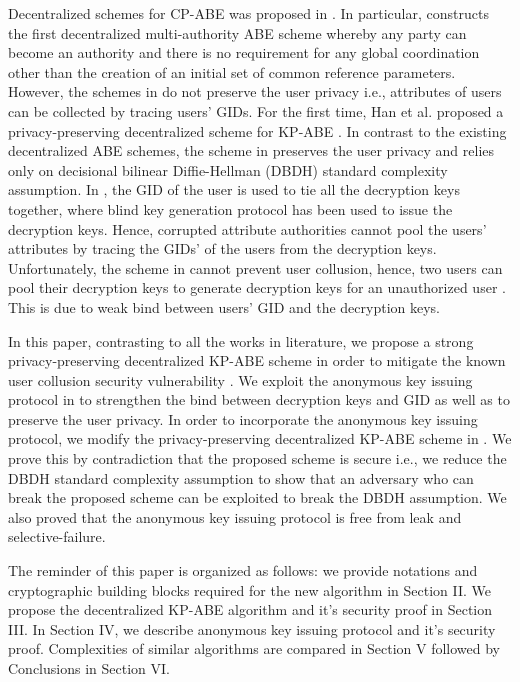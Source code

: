 \documentclass[10pt,journal]{IEEEtran}
\begin{document}
Decentralized schemes for CP-ABE was proposed in \cite{Dabe,Muller1, Muller2, ZLiu, OT13}.  In particular, \cite{Dabe} constructs the first decentralized multi-authority ABE scheme whereby any party can become an authority and there is no requirement for any global coordination
other than the creation of an initial set of common reference parameters. However, the schemes in \cite{Dabe,BWaters,Muller1, Muller2, ZLiu, OT13} do not preserve the user privacy i.e., attributes of users can be collected by tracing users' GIDs. For the first time, Han et al. proposed a privacy-preserving decentralized scheme for KP-ABE \cite{main1}. In contrast to the existing decentralized ABE schemes,  the scheme in \cite{main1} preserves the user privacy and relies only on decisional bilinear Diffie-Hellman (DBDH) standard complexity assumption.
In \cite{main1}, the GID of the user is used to tie all the decryption keys together, where blind key generation protocol has been used to issue the decryption keys. Hence, corrupted attribute authorities cannot pool the users' attributes by tracing the GIDs' of the users from the decryption keys. Unfortunately, the scheme in \cite{main1} cannot prevent  user collusion, hence, two users can pool their decryption keys  to generate decryption keys for an unauthorized user \cite{main2}. This is due to weak bind between users' GID and the decryption keys.

In this paper, contrasting to all the works in literature, we propose a strong privacy-preserving decentralized KP-ABE scheme in order to mitigate the known user collusion security vulnerability \cite{main2}. We exploit  the anonymous key issuing protocol in \cite{imaabe} to strengthen the bind between decryption keys and GID as well as to preserve the user privacy. In order to incorporate the anonymous key issuing protocol, we  modify the privacy-preserving decentralized KP-ABE scheme in \cite{main1}. We prove this by contradiction that the proposed scheme is secure i.e., we reduce the DBDH standard complexity assumption to show that an adversary who can break the proposed scheme  can be exploited to break the DBDH assumption. We also proved that the anonymous key issuing protocol is free from leak and selective-failure.

The reminder  of this paper is organized as follows: we provide notations and cryptographic building blocks required for the new algorithm in Section II. We propose the decentralized KP-ABE algorithm and it's security proof in Section III. In Section IV, we describe anonymous key issuing protocol and it's security proof. Complexities of similar algorithms are compared in Section V followed by Conclusions  in Section VI.
\end{document}
